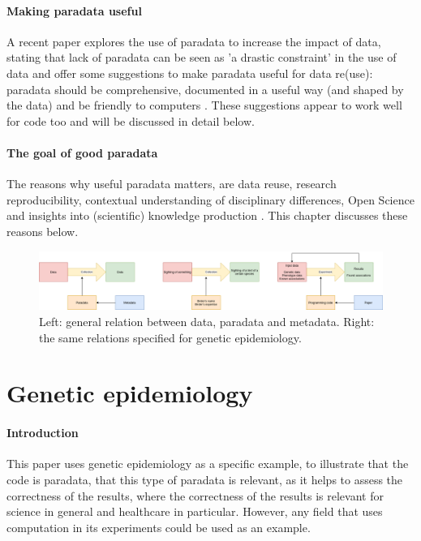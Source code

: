 \paragraph{Making paradata useful}

A recent paper explores the use of paradata to increase the impact of data,
stating that lack of paradata can be seen as 'a drastic constraint'
in the use of data and offer some suggestions to 
make paradata useful for data re(use):
paradata should be comprehensive, documented in a useful 
way (and shaped by the data) and be friendly to computers \cite{huvila2022improving}.
These suggestions appear to work well for code too
and will be discussed in detail below.

\paragraph{The goal of good paradata}

The reasons why useful paradata matters,
are data reuse, research reproducibility, 
contextual understanding of disciplinary differences,
Open Science and insights into 
(scientific) knowledge production \cite{huvila2022improving}.
This chapter discusses these reasons below.

\begin{figure}[!htbp]
  \centering
  \includegraphics[width=\linewidth]{figure_1.png}
  \caption{
    Left: general relation between data, paradata and metadata.
    Right: the same relations specified for genetic epidemiology.
  }
  \label{fig:figure_1}
\end{figure}

\section{Genetic epidemiology}

\paragraph{Introduction}

This paper uses genetic epidemiology as a specific example,
to illustrate that the code is paradata,
that this type of paradata is relevant, as it helps 
to assess the correctness of the results,
where the correctness of the results is relevant for 
science in general and healthcare in particular.
However, any field that uses computation in its experiments
could be used as an example.


